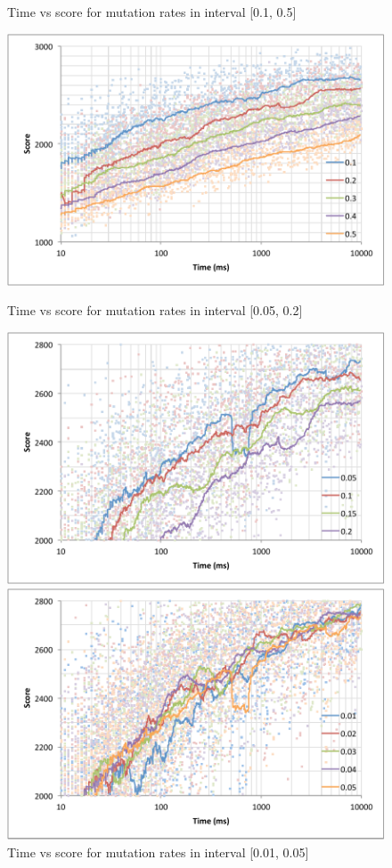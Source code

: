 \documentclass{acm_proc_article-sp}
\begin{document}
\begin{figure}
  \caption{Time vs score for mutation rates in interval [0.1, 0.5]}
  \label{fig:mutation_rate_1}
  \includegraphics[width=\linewidth]{mutation_rate_1.pdf}

  \caption{Time vs score for mutation rates in interval [0.05, 0.2]}
  \label{fig:mutation_rate_2}
  \includegraphics[width=\linewidth]{mutation_rate_2.pdf}

  \caption{Time vs score for mutation rates in interval [0.01, 0.05]}
  \label{fig:mutation_rate_3}
  \includegraphics[width=\linewidth]{mutation_rate_3.pdf}
\end{figure}
\end{document}
